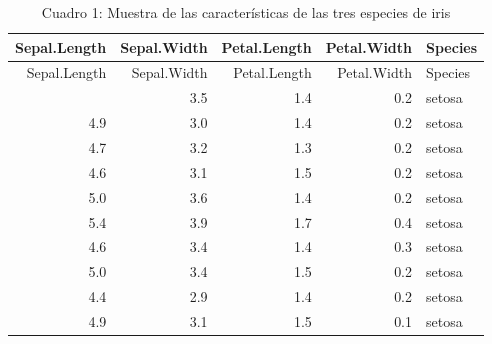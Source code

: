 \documentclass[
]{article}
\newenvironment{Shaded}{\begin{snugshade}}{\end{snugshade}}
\newcommand{\AttributeTok}[1]{\textcolor[rgb]{0.13,0.29,0.53}{#1}}
\newcommand{\FunctionTok}[1]{\textcolor[rgb]{0.13,0.29,0.53}{\textbf{#1}}}
\newcommand{\NormalTok}[1]{#1}
\newcommand{\SpecialCharTok}[1]{\textcolor[rgb]{0.81,0.36,0.00}{\textbf{#1}}}
\newcommand{\StringTok}[1]{\textcolor[rgb]{0.31,0.60,0.02}{#1}}
\begin{document}
\begin{longtable}[]{@{}rrrrl@{}}
\caption{Cuadro 1: Muestra de las características de las tres especies
de iris}\tabularnewline
\toprule\noalign{}
Sepal.Length & Sepal.Width & Petal.Length & Petal.Width & Species \\
\midrule\noalign{}
\endfirsthead
\toprule\noalign{}
Sepal.Length & Sepal.Width & Petal.Length & Petal.Width & Species \\
\midrule\noalign{}
\endhead
\bottomrule\noalign{}
\endlastfoot
5.1 & 3.5 & 1.4 & 0.2 & setosa \\
4.9 & 3.0 & 1.4 & 0.2 & setosa \\
4.7 & 3.2 & 1.3 & 0.2 & setosa \\
4.6 & 3.1 & 1.5 & 0.2 & setosa \\
5.0 & 3.6 & 1.4 & 0.2 & setosa \\
5.4 & 3.9 & 1.7 & 0.4 & setosa \\
4.6 & 3.4 & 1.4 & 0.3 & setosa \\
5.0 & 3.4 & 1.5 & 0.2 & setosa \\
4.4 & 2.9 & 1.4 & 0.2 & setosa \\
4.9 & 3.1 & 1.5 & 0.1 & setosa \\
\end{longtable}

\begin{Shaded}
\end{Shaded}
\end{document}

